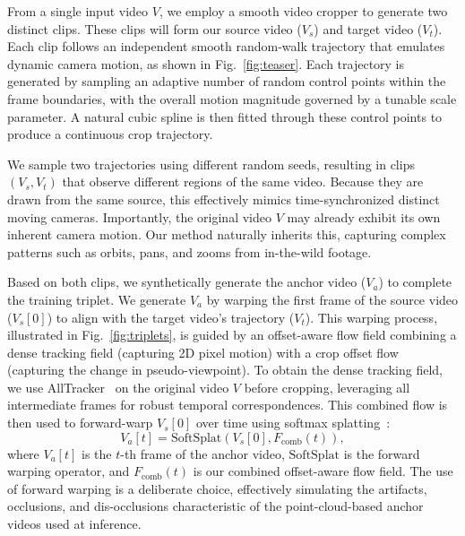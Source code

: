 From a single input video $V$, we employ a smooth video cropper to generate two distinct clips. These clips will form our source video ($V_s$) and target video ($V_t$). Each clip follows an independent smooth random-walk trajectory that emulates dynamic camera motion, as shown in Fig.~\ref{fig:teaser}. Each trajectory is generated by sampling an adaptive number of random control points within the frame boundaries, with the overall motion magnitude governed by a tunable scale parameter. A natural cubic spline is then fitted through these control points to produce a continuous crop trajectory.


We sample two trajectories using different random seeds, resulting in clips $(V_{s}, V_{t})$ that observe different regions of the same video. Because they are drawn from the same source, this effectively mimics time-synchronized distinct moving cameras. Importantly, the original video $V$ may already exhibit its own inherent camera motion. Our method naturally inherits this, capturing complex patterns such as orbits, pans, and zooms from in-the-wild footage.

Based on both clips, we synthetically generate the anchor video ($V_{a}$) to complete the training triplet. We generate $V_{a}$ by warping the first frame of the source video ($V_{s}[0]$) to align with the target video's trajectory ($V_{t}$). This warping process, illustrated in Fig.~\ref{fig:triplets}, is guided by an offset-aware flow field combining a dense tracking field (capturing 2D pixel motion) with a crop offset flow (capturing the change in pseudo-viewpoint). To obtain the dense tracking field, we use AllTracker~\cite{4d_recon_harley2025alltracker} on the original video $V$ before cropping, leveraging all intermediate frames for robust temporal correspondences. This combined flow is then used to forward-warp $V_{s}[0]$ over time using softmax splatting~\cite{softmax_splatting}:
\begin{equation}
V_{a}[t] = \text{SoftSplat}(V_s[0], F_{\text{comb}}(t)),
\label{eq:anchor_warping}
\end{equation}
where $V_a[t]$ is the $t$-th frame of the anchor video, $\text{SoftSplat}$ is the forward warping operator, and $F_{\text{comb}}(t)$ is our combined offset-aware flow field.  The use of forward warping is a deliberate choice, effectively simulating the artifacts, occlusions, and dis-occlusions characteristic of the point-cloud-based anchor videos used at inference.




